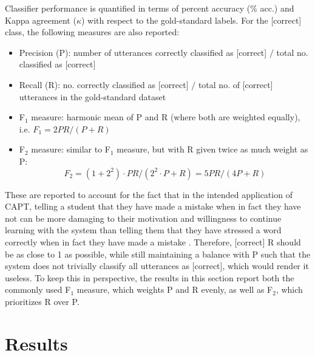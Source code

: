 \documentclass[a4paper]{article}
\begin{document}
		Classifier performance is quantified in terms of percent accuracy (\% acc.) and Kappa agreement ($\kappa$) with respect to the gold-standard labels. For the [correct] class, 
	the following measures are also reported:
	\begin{itemize}
			\item{Precision (P): number of utterances correctly classified as [correct] $/$ total no. classified as [correct]
			}
			\item{Recall (R): no. correctly classified as [correct] $/$ total no. of [correct] utterances in the gold-standard dataset
			}
			\item{F$_1$ measure:
			harmonic mean of P and R (where both are weighted equally), i.e. $F_1 = 2PR/(P+R)$
			}
			\item{F$_2$ measure: 
			similar to F$_1$ measure, but with R given twice as much weight as P: %
			\[F_2 = (1+2^2) \cdot PR/(2^2 \cdot P+R) = 5PR/(4P+R)\]
			}
	\end{itemize}
	These are reported to account for the fact that in the intended application of CAPT, telling a student that they have made a mistake when in fact they have not can be more damaging to their motivation and willingness to continue learning with the system than telling them that they have stressed a word correctly when in fact they have made a mistake \cite{Neri2002}. Therefore, [correct] R should be as close to 1 as possible, while still maintaining a balance with P such that the system does not trivially classify all utterances as [correct], which would render it useless. To keep this in perspective, the results in this section report both the commonly used F$_1$ measure, which weights P and R evenly, as well as F$_2$, which prioritizes R over P.
		

	\section{Results}
	\label{sec:results}
	
\end{document}
